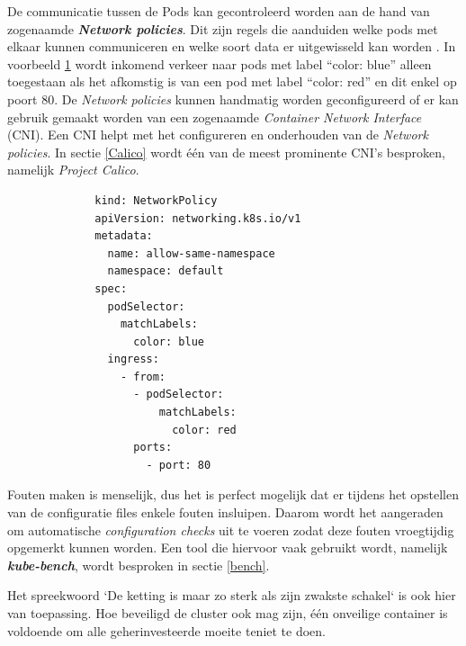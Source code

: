 De communicatie tussen de Pods kan gecontroleerd worden aan de hand van zogenaamde \textbf{\textit{Network policies}}. Dit zijn regels die aanduiden welke pods met elkaar kunnen communiceren en welke soort data er uitgewisseld kan worden \autocite{Venugopal2019, Bannister2021}. In voorbeeld \ref{netpolicy} wordt inkomend verkeer naar pods met label ``color: blue'' alleen toegestaan als het afkomstig is van een pod met label ``color: red'' en dit enkel op poort 80. De \textit{Network policies} kunnen handmatig worden geconfigureerd of er kan gebruik gemaakt worden van een zogenaamde \textit{Container Network Interface} (CNI). Een CNI helpt met het configureren en onderhouden van de \textit{Network policies}. In sectie \ref{Calico} wordt één van de meest prominente CNI's besproken, namelijk \textit{Project Calico}.

\begin{figure}[h!] \label{netpolicy}
    \begin{verbatim}
        kind: NetworkPolicy
        apiVersion: networking.k8s.io/v1
        metadata:
          name: allow-same-namespace
          namespace: default
        spec:
          podSelector:
            matchLabels:
              color: blue
          ingress:
            - from:
              - podSelector:
                  matchLabels:
                    color: red
              ports:
                - port: 80
    \end{verbatim}
\end{figure}

Fouten maken is menselijk, dus het is perfect mogelijk dat er tijdens het opstellen van de configuratie files enkele fouten insluipen. Daarom wordt het aangeraden om automatische \textit{configuration checks} uit te voeren zodat deze fouten vroegtijdig opgemerkt kunnen worden. Een tool die hiervoor vaak gebruikt wordt, namelijk \textbf{\textit{kube-bench}}, wordt besproken in sectie \ref{bench}.


Het spreekwoord `De ketting is maar zo sterk als zijn zwakste schakel` is ook hier van toepassing. Hoe beveiligd de cluster ook mag zijn, één onveilige container is voldoende om alle geherinvesteerde moeite teniet te doen.

